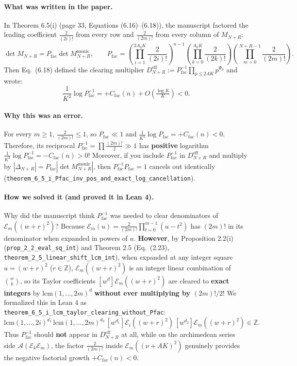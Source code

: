 \documentclass[11pt,a4paper]{article}
\begin{document}
\paragraph{What was written in the paper.}
In Theorem 6.5(i) (page 33, Equations (6.16)--(6.18)), the manuscript factored the leading coefficient $\frac{2}{(2i)!}$ from every row and $\frac{2}{(2m)!}$ from every column of $M_{N+R}$:
\[
  \det M_{N+R} = P_{\mathrm{fac}} \det M_{N+R}^{\mathrm{monic}}, \qquad
  P_{\mathrm{fac}} = \left(\prod_{i=1}^{2A_0 K}\frac{2}{(2i)!}\right)^{n-1}\left(\prod_{k=0}^{A_0 K}\frac{2}{(2k)!}\right)\left(\prod_{m=0}^{N+R-1}\frac{2}{(2m)!}\right).
\]
Then Eq.\ (6.18) defined the clearing multiplier $D_{N+R}^{\mathrm{eff}} := P_{\mathrm{fac}}^{-1} \prod_{p \le 2AK} p^{\Phi_p}$ and wrote:
\[
  \frac{1}{K^2}\log P_{\mathrm{fac}}^{-1} = +C_{\mathrm{fac}}(n) + O(\tfrac{\log K}{K}) < 0.
\]

\paragraph{Why this was an error.}
For every $m \ge 1$, $\frac{2}{(2m)!} \le 1$, so $P_{\mathrm{fac}} \ll 1$ and $\frac{1}{K^2}\log P_{\mathrm{fac}} = +C_{\mathrm{fac}}(n) < 0$. Therefore, its reciprocal $P_{\mathrm{fac}}^{-1} = \prod \frac{(2m)!}{2} \gg 1$ has \textbf{positive} logarithm $\frac{1}{K^2}\log P_{\mathrm{fac}}^{-1} = -C_{\mathrm{fac}}(n) > 0$! Moreover, if you include $P_{\mathrm{fac}}^{-1}$ in $D_{N+R}^{\mathrm{eff}}$ and multiply by $|\Delta_{N+R}| = P_{\mathrm{fac}}|\det M_{N+R}^{\mathrm{monic}}|$, then $P_{\mathrm{fac}}^{-1} P_{\mathrm{fac}} = 1$ cancels out identically (\texttt{theorem\_6\_5\_i\_Pfac\_inv\_pos\_and\_exact\_log\_cancellation}).

\paragraph{How we solved it (and proved it in Lean 4).}
Why did the manuscript think $P_{\mathrm{fac}}^{-1}$ was needed to clear denominators of $\mathcal{E}_m((w+r)^2)$? Because $\mathcal{E}_m(u) = \frac{2}{(2m)!}\prod_{t=0}^{m-1}(u-t^2)$ has $(2m)!$ in its denominator when expanded in powers of $u$.
\textbf{However}, by Proposition 2.2(i) (\texttt{prop\_2\_2\_eval\_sq\_int}) and Theorem 2.5 (Eq.\ (2.23), \texttt{theorem\_2\_5\_linear\_shift\_lcm\_int}), when expanded at any integer square $u = (w+r)^2$ ($r \in \mathbb{Z}$), $\mathcal{E}_m((w+r)^2)$ is an integer linear combination of $\binom{w}{k}$, so its Taylor coefficients $[w^d]\mathcal{E}_m((w+r)^2)$ are cleared to \textbf{exact integers} by $\mathrm{lcm}(1, \dots, 2m)^d$ \textbf{without ever multiplying by $(2m)!/2$}!
We formalized this in Lean 4 as \texttt{theorem\_6\_5\_i\_lcm\_taylor\_clearing\_without\_Pfac}:
\[
  \mathrm{lcm}(1, \dots, 2i)^{d_1}\,\mathrm{lcm}(1, \dots, 2m)^{d_2}\,[w^{d_1}]\mathcal{E}_i((w+r)^2)\,[w^{d_2}]\mathcal{E}_m((w+r)^2) \in \mathbb{Z}.
\]
Thus $P_{\mathrm{fac}}^{-1}$ should \textbf{not} appear in $D_{N+R}^{\mathrm{eff}}$ at all, while on the archimedean series side $\mathcal{A}(\mathcal{E}_k\mathcal{E}_m)$, the factor $\frac{2}{(2m)!}$ inside $\mathcal{E}_m((\nu+AK)^2)$ genuinely provides the negative factorial growth $+C_{\mathrm{fac}}(n) < 0$.
\end{document}
